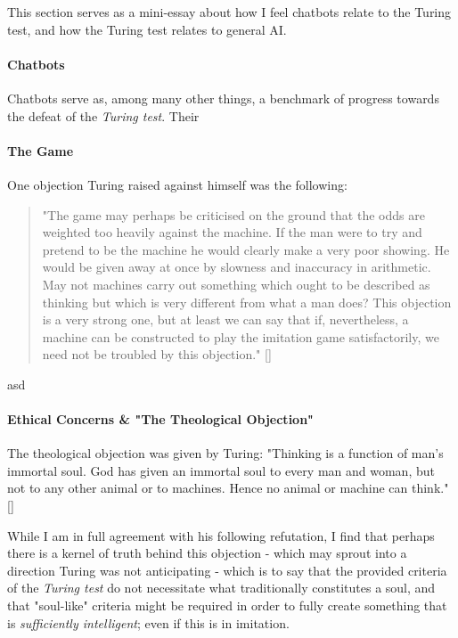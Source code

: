 \documentclass[]{article}
\begin{document}
This section serves as a mini-essay about how I feel chatbots relate to the Turing test, and how the Turing test relates to general AI.

\paragraph{Chatbots} Chatbots serve as, among many other things, a benchmark of progress towards the defeat of the \emph{Turing test}. Their 

\paragraph{The Game} One objection Turing raised against himself was the following:
\begin{quote}
	"The game may perhaps be criticised on the ground that the odds are weighted too heavily against the machine. If the man were to try and pretend to be the machine he would clearly make a very poor showing. He would be given away at once by slowness and inaccuracy in arithmetic. May not machines carry out something which ought to be described as thinking but which is very different from what a man does? This objection is a very strong one, but at least we can say that if, nevertheless, a machine can be constructed to play the imitation game satisfactorily, we need not be troubled by this objection." []
	
	\cite{Turing}
\end{quote}
asd

\paragraph{Ethical Concerns \& "The Theological Objection"} The theological objection was given by Turing: "Thinking is a function of man's immortal soul. God has given an immortal soul to every man and woman, but not to any other animal or to machines. Hence no animal or machine can think." []

While I am in full agreement with his following refutation, I find that perhaps there is a kernel of truth behind this objection - which may sprout into a direction Turing was not anticipating - which is to say that the provided criteria of the \emph{Turing test} do not necessitate what traditionally constitutes a soul, and that "soul-like" criteria might be required in order to fully create something that is \emph{sufficiently intelligent}; even if this is in imitation.
\end{document}
